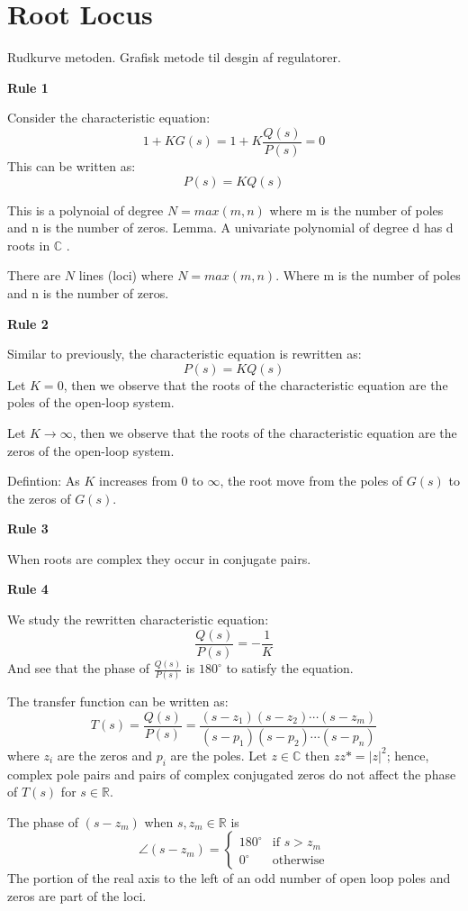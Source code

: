 \section{Root Locus}
Rudkurve metoden.
Grafisk metode til desgin af regulatorer.

\textbf{Rule 1}

Consider the characteristic equation:
$$ 1+KG(s) = 1 + K\frac{Q(s)}{P(s)} = 0$$
This can be written as:
$$P(s) = KQ(s)$$

This is a polynoial of degree $N = max(m,n)$ where m is the number of poles and n is the number of zeros.
Lemma. A univariate polynomial of degree d has d roots in $\mathbb{C}$ .

There are $N$ lines (loci) where $N=max(m,n)$. Where m is the number of poles and n is the number of zeros.

\textbf{Rule 2}

Similar to previously, the characteristic equation is rewritten as:
$$P(s) = KQ(s)$$
Let $K=0$, then we observe that the roots of the characteristic equation are the poles of
the open-loop system.

Let $K\to \infty$, then we observe that the roots of the characteristic equation are the zeros of
the open-loop system.

Defintion: As $K$ increases from 0 to $\infty$, the root move from the poles of $G(s)$
to the zeros of $G(s)$.

\textbf{Rule 3}

When roots are complex they occur in conjugate pairs.

\textbf{Rule 4}

We study the rewritten characteristic equation:
$$\frac{Q(s)}{P(s)} = -\frac{1}{K}$$
And see that the phase of $\frac{Q(s)}{P(s)}$ is $180^\circ$ to satisfy the equation.

The transfer function can be written as:
$$T(s) = \frac{Q(s)}{P(s)} = \frac{(s-z_1)(s-z_2)\cdots(s-z_m)}{(s-p_1)(s-p_2)\cdots(s-p_n)}$$
where $z_i$ are the zeros and $p_i$ are the poles.
Let $z \in \mathbb{C}$ then $zz* = |z|^2$; hence, complex pole pairs and pairs of complex
conjugated zeros do not affect the phase of $T(s)$ for $s \in \mathbb{R}$.

The phase of $(s-z_m)$ when $s,z_m \in \mathbb{R}$ is
\begin{equation}
	\angle(s-z_m) =
	\begin{cases}
		180^\circ & \text{if } s > z_m \\
		0^\circ   & \text{otherwise}
	\end{cases}
\end{equation}
The portion of the real axis to the left of an odd number of open loop poles and zeros
are part of the loci.


